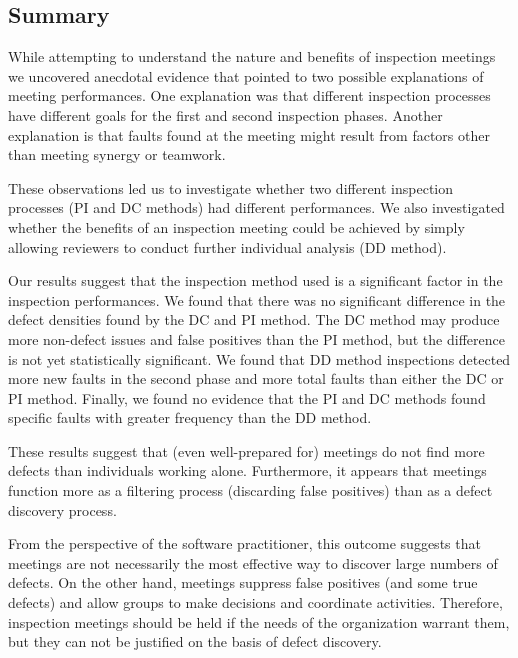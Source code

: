 \subsection{Summary}

While attempting to understand the nature and benefits of inspection 
meetings we uncovered anecdotal evidence that pointed to two possible
explanations of meeting performances. One explanation was that different 
inspection processes have different goals for the first and second inspection 
phases. Another explanation is that faults found at the meeting might 
result from factors other than meeting synergy or teamwork.

These observations led us to investigate whether two different 
inspection processes (PI and DC methods) had different performances. 
We also investigated whether the benefits of an inspection meeting could 
be achieved by simply allowing reviewers to conduct further individual analysis
(DD method). 

Our results suggest that the inspection method used is a significant 
factor in the inspection performances. We found that there was no
significant difference in the defect densities found by the DC and PI
method. The DC method may produce more non-defect issues and false positives 
than the PI method, but the difference is not yet statistically significant. 
We found that DD method inspections detected more new faults in the second 
phase and more total faults than either the DC or PI method. Finally, we found
no evidence that the PI and DC methods found specific faults with greater
frequency than the DD method.

These results suggest that (even well-prepared for) meetings do not find more 
defects than individuals working alone. Furthermore, it appears that meetings
function more as a filtering process (discarding false positives) than as 
a defect discovery process.

From the perspective of the software practitioner, this outcome suggests that 
meetings are not necessarily the most effective way to discover large numbers of defects.
On the other hand, meetings suppress false positives (and some true defects) and
allow groups to make decisions and coordinate activities.  Therefore, inspection meetings 
should be held if the needs of the organization warrant them, but they can not be justified
on the basis of defect discovery. 


